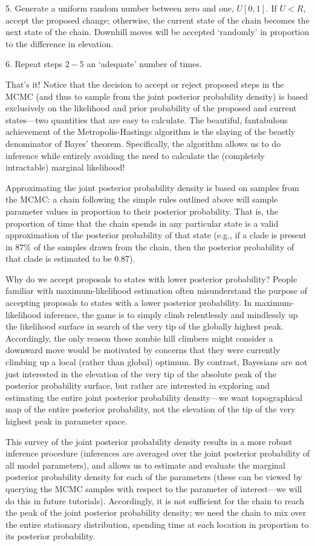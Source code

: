 \documentclass[11pt]{article}
\begin{document}
\begin{enumerate}
5. Generate a uniform random number between zero and one, $U[0,1]$. If $U<R$, accept
the proposed change; otherwise, the current state of the chain becomes the next state of the chain. Downhill moves will be accepted `randomly’ in proportion to the difference in elevation.

6. Repeat steps $2-5$ an `adequate’ number of times.

That’s it! Notice that the decision to accept or reject proposed steps in the MCMC (and thus to sample from the joint posterior probability density) is based exclusively on the likelihood and prior probability of the proposed and current states—two quantities that are easy to calculate. The beautiful, fantabulous achievement of the Metropolis-Hastings algorithm is the slaying of the beastly denominator of Bayes’ theorem. Specifically, the algorithm allows us to do inference while entirely avoiding the need to calculate the (completely intractable) marginal likelihood!

Approximating the joint posterior probability density is based on samples from the MCMC: a chain following the simple rules outlined above will sample parameter values in proportion to their posterior probability. That is, the proportion of time that the chain spends in any particular state is a valid approximation of the posterior probability of that state (e.g., if a clade is present in $87\%$ of the samples drawn from the chain, then the posterior probability of that clade is estimated to be $0.87$).

Why do we accept proposals to states with lower posterior probability? People familiar with maximum-likelihood estimation often misunderstand the purpose of accepting proposals to states with a lower posterior probability. In maximum-likelihood inference, the game is to simply climb relentlessly and mindlessly up the likelihood surface in search of the very tip of the globally highest peak. Accordingly, the only reason these zombie hill climbers might consider a downward move would be motivated by concerns that they were currently climbing up a local (rather than global) optimum. By contrast, Bayesians are not just interested in the elevation of the very tip of the absolute peak of the posterior probability surface, but rather are interested in exploring and estimating the entire joint posterior probability density—we want topographical map of the entire posterior probability, not the elevation of the tip of the very highest peak in parameter space.

This survey of the joint posterior probability density results in a more robust inference procedure (inferences are averaged over the joint posterior probability of all model parameters), and allows us to estimate and evaluate the marginal posterior probability density for each of the parameters (these can be viewed by querying the MCMC samples with respect to the parameter of interest—we will do this in future tutorials). Accordingly, it is not sufficient for the chain to reach the peak of the joint posterior probability density; we need the chain to mix over the entire stationary distribution, spending time at each location in proportion to its posterior probability.


\end{enumerate}
\end{document}
